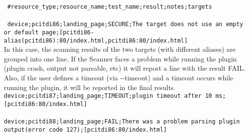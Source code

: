 \texttt{
\#resource\_type;resource\_name;test\_name;result;notes;targets}
\\
\\
\texttt{
device;pcitdi86;landing\_page;SECURE;The target does not use an empty or default page;[pcitdi86-alias(pcitdi86):80/index.html,pcitdi86:80/index.html]
}
\\
In this case, the scanning results of the two targets (with different aliases) are grouped into one line.
If the Scanner faces a problem while running the plugin (plugin crash, output not parsable, etc) it will report a line with the result FAIL. Also, if the user defines a timeout (via -{}-timeout) and a timeout occurs while running the plugin, it will be reported in the final results.
\\ 
\texttt{device;pcitdi87;landing\_page;TIMEOUT;plugin timeout after 10 ms;[pcitdi86:80/index.html]}
\\
\\
\texttt{device;pcitdi88;landing\_page;FAIL;There was a problem parsing plugin output(error code 127);[pcitdi86:80/index.html]}
\\
\\
%
%
%    
%

